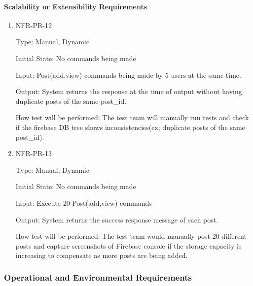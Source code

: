 \documentclass[12pt, titlepage]{article}
\begin{document}
 \paragraph{Scalability or Extensibility Requirements}
\begin{enumerate}
    \item{NFR-PR-12\\}
    
    Type: Manual, Dynamic
    
    Initial State: No commands being made
    
    Input: Post(add,view) commands being made by 5 users at the same time.
    
    Output: System returns the response at the time of output without having duplicate posts of the same post\_id.
    
    How test will be performed: The test team will manually run tests and check if the firebase DB tree shows inconsistencies(ex; duplicate posts of the same post\_id).
    
    \item{NFR-PR-13\\}
    
    Type: Manual, Dynamic
    
    Initial State: No commands being made
    
    Input: Execute 20 Post(add,view) commands
    
    Output: System returns the success response message of each post.
    
    How test will be performed: The test team would manually post 20 different posts and capture screenshots of Firebase console if the storage capacity is increasing to compensate as more posts are being added.
    

 \end{enumerate}  

\subsubsection{Operational and Environmental Requirements}
\end{document}
